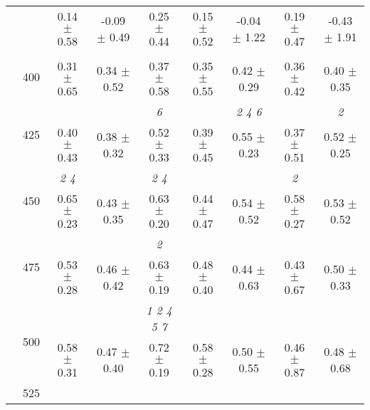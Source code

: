 \begin{table}[h]
{\begin{tabular}{
        ccccccccc}
 & & \cellcolor[HTML]{EFEFEF} 0.14 $\pm$ 0.58& \cellcolor[HTML]{EFEFEF} -0.09 $\pm$ 0.49& \cellcolor[HTML]{EFEFEF} 0.25 $\pm$ 0.44& \cellcolor[HTML]{EFEFEF} 0.15 $\pm$ 0.52& \cellcolor[HTML]{EFEFEF} -0.04 $\pm$ 1.22& \cellcolor[HTML]{EFEFEF} 0.19 $\pm$ 0.47& \cellcolor[HTML]{EFEFEF} -0.43 $\pm$ 1.91 \\ 
 & \multirow{2}{*}{400}& & & & & & &  \\ 
 & & 0.31 $\pm$ 0.65& 0.34 $\pm$ 0.52& 0.37 $\pm$ 0.58& 0.35 $\pm$ 0.55& 0.42 $\pm$ 0.29& 0.36 $\pm$ 0.42& 0.40 $\pm$ 0.35 \\ 
 & \multirow{2}{*}{425}& \cellcolor[HTML]{EFEFEF} & \cellcolor[HTML]{EFEFEF} & \cellcolor[HTML]{EFEFEF} \textit{ 6 }& \cellcolor[HTML]{EFEFEF} & \cellcolor[HTML]{EFEFEF} \textit{ 2 4 6 }& \cellcolor[HTML]{EFEFEF} & \cellcolor[HTML]{EFEFEF} \textit{ 2 } \\ 
 & & \cellcolor[HTML]{EFEFEF} 0.40 $\pm$ 0.43& \cellcolor[HTML]{EFEFEF} 0.38 $\pm$ 0.32& \cellcolor[HTML]{EFEFEF} 0.52 $\pm$ 0.33& \cellcolor[HTML]{EFEFEF} 0.39 $\pm$ 0.45& \cellcolor[HTML]{EFEFEF} 0.55 $\pm$ 0.23& \cellcolor[HTML]{EFEFEF} 0.37 $\pm$ 0.51& \cellcolor[HTML]{EFEFEF} 0.52 $\pm$ 0.25 \\ 
 & \multirow{2}{*}{450}& \textit{ 2 4 }& & \textit{ 2 4 }& & & \textit{ 2 }&  \\ 
 & & 0.65 $\pm$ 0.23& 0.43 $\pm$ 0.35& 0.63 $\pm$ 0.20& 0.44 $\pm$ 0.47& 0.54 $\pm$ 0.52& 0.58 $\pm$ 0.27& 0.53 $\pm$ 0.52 \\ 
 & \multirow{2}{*}{475}& \cellcolor[HTML]{EFEFEF} & \cellcolor[HTML]{EFEFEF} & \cellcolor[HTML]{EFEFEF} \textit{ 2 }& \cellcolor[HTML]{EFEFEF} & \cellcolor[HTML]{EFEFEF} & \cellcolor[HTML]{EFEFEF} & \cellcolor[HTML]{EFEFEF}  \\ 
 & & \cellcolor[HTML]{EFEFEF} 0.53 $\pm$ 0.28& \cellcolor[HTML]{EFEFEF} 0.46 $\pm$ 0.42& \cellcolor[HTML]{EFEFEF} 0.63 $\pm$ 0.19& \cellcolor[HTML]{EFEFEF} 0.48 $\pm$ 0.40& \cellcolor[HTML]{EFEFEF} 0.44 $\pm$ 0.63& \cellcolor[HTML]{EFEFEF} 0.43 $\pm$ 0.67& \cellcolor[HTML]{EFEFEF} 0.50 $\pm$ 0.33 \\ 
 & \multirow{2}{*}{500}& & & \textit{ 1 2 4 5 7 }& & & &  \\ 
 & & 0.58 $\pm$ 0.31& 0.47 $\pm$ 0.40& 0.72 $\pm$ 0.19& 0.58 $\pm$ 0.28& 0.50 $\pm$ 0.55& 0.46 $\pm$ 0.87& 0.48 $\pm$ 0.68 \\ 
 & \multirow{2}{*}{525}& \cellcolor[HTML]{EFEFEF} & \cellcolor[HTML]{EFEFEF} & \cellcolor[HTML]{EFEFEF} & \cellcolor[HTML]{EFEFEF} & \cellcolor[HTML]{EFEFEF} & \cellcolor[HTML]{EFEFEF} & \cellcolor[HTML]{EFEFEF}  \\ 

\end{tabular}}
\end{table}
